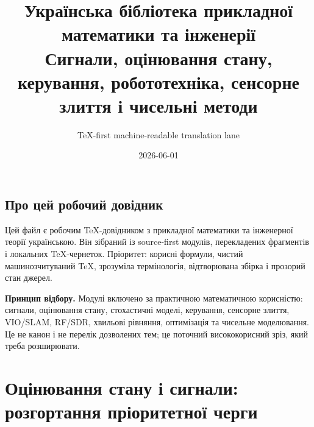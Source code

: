 \documentclass[11pt,a4paper,oneside]{book}
\title{Українська бібліотека прикладної математики та інженерії\\\large Сигнали, оцінювання стану, керування, робототехніка, сенсорне злиття і чисельні методи}
\author{TeX-first machine-readable translation lane}
\date{2026-06-01}
\begin{document}
\pagestyle{plain}
\frontmatter
\maketitle

\chapter*{Про цей робочий довідник}
Цей файл є робочим TeX-довідником з прикладної математики та інженерної теорії українською. Він зібраний із source-first модулів, перекладених фрагментів і локальних TeX-чернеток. Пріоритет: корисні формули, чистий машинозчитуваний TeX, зрозуміла термінологія, відтворювана збірка і прозорий стан джерел.

\medskip
\noindent\textbf{Принцип відбору.} Модулі включено за практичною математичною корисністю: сигнали, оцінювання стану, стохастичні моделі, керування, сенсорне злиття, VIO/SLAM, RF/SDR, хвильові рівняння, оптимізація та чисельне моделювання. Це не канон і не перелік дозволених тем; це поточний висококорисний зріз, який треба розширювати.

\tableofcontents

\mainmatter









\part{Оцінювання стану і сигнали: розгортання пріоритетної черги}

















\end{document}
